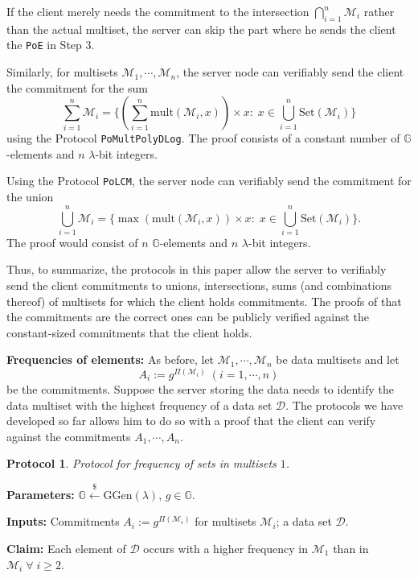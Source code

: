\documentclass[11pt, lettersize, notitlepage, leqno, footskip=0.6cm]{article}
\newcommand{\sett}{\mr{Set}}
\newcommand{\mul}{\mr{mult}}
\newcommand{\mc}{\mathcal}
\newcommand{\mb}{\mathbb}
\newcommand{\mr}{\mathrm}
\newcommand{\lam}{\lambda}
\newcommand{\lamb}{\lambda}
\newcommand{\vs}{\vspace{-0.15cm}}
\newcommand{\noin}{\noindent}
\newtheorem{Prot}[Thm]{Protocol}
\numberwithin{equation}{section}
\begin{document}
If the client merely needs the commitment to the intersection $\bigcap\limits_{i=1}^n \mc{M}_i$ rather than the actual multiset, the server can skip the part where he sends the client the \verb|PoE| in Step 3.


Similarly, for multisets $\mc{M}_1,\cdots,\mc{M}_n$, the server node can verifiably send the client the commitment for the sum \vs $$\sum\limits_{i=1}^n \mc{M}_i = \{(\sum\limits_{i=1}^n \mul(\mc{M}_i, x))\times x:\; x\in\bigcup\limits_{i=1}^n \sett(\mc{M}_i)\} $$ using the Protocol \verb|PoMultPolyDLog|. The proof consists of a constant number of $\mb{G}$-elements and $n$ $\lam$-bit integers.

Using the Protocol \verb|PoLCM|, the server node can verifiably send the commitment for the union \vs $$\bigcup\limits_{i=1}^n \mc{M}_i = \{\max(\mul(\mc{M}_i, x))\times x:\; x\in\bigcup\limits_{i=1}^n \sett(\mc{M}_i)\} .$$ The proof would consist of $n$ $\mb{G}$-elements and $n$ $\lam$-bit integers.

Thus, to summarize, the protocols in this paper allow the server to verifiably send the client commitments to unions, intersections, sums (and combinations thereof) of multisets for which the client holds commitments. The proofs of that the commitments are the correct ones can be publicly verified against the constant-sized commitments that the client holds.

\bigskip

\noin \textbf{Frequencies of elements:} As before, let $\mc{M}_1,\cdots, \mc{M}_n$ be data multisets and let \vs $$A_i:= g^{\Pi(\mc{M}_i)}\;(i=1,\cdots,n) $$ be the commitments. Suppose the server storing the data needs to identify the data multiset with the highest frequency of a data set $\mc{D}$. The protocols we have developed so far allows him to do so with a proof that the client can verify against the commitments $A_1,\cdots,A_n$.\vspace{0.1cm}

\begin{Prot} Protocol for frequency of sets in multisets $1$.\end{Prot} \vspace{-0.3cm}

\noin \textbf{Parameters:} $\mb{G}\xleftarrow{\$} \mr{GGen}(\lamb)$,\; $g\in \mb{G}$.

\noin \textbf{Inputs:} Commitments $A_i := g^{\Pi(\mc{M}_i)}$ for multisets $\mc{M}_i$; a data set $\mc{D}$.

\noin \textbf{Claim:} Each element of $\mc{D}$ occurs with a higher frequency in $\mc{M}_1$ than in $\mc{M}_i\;\forall\;i\geq 2$.
\end{document}
